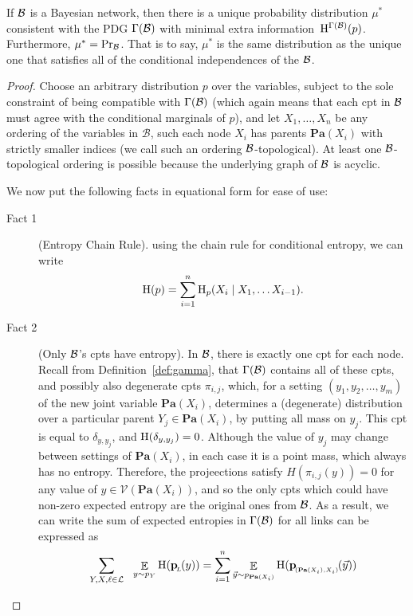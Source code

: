 \documentclass{article}
\newcommand{\bp}[1][L]{\mat{p}_{\!_{#1}\!}}
\newcommand{\V}{\mathcal V}
\def\Pa{\mathbf{Pa}}
\def\extrainfo{extra information}
\begin{document}
\begin{theorem}\label{thm:bns-are-pdgs}
	If $\cal B$ is a Bayesian network, then there is a unique probability distribution $\mu^*$ consistent with the PDG $\Gamma(\cal B)$ with minimal \extrainfo\ $\mathrm{H}^{\Gamma(\mathcal B)}(p)$. Furthermore, $\mu^* = \Pr_{\cal B}$. That is to say, $\mu^*$ is the same distribution as the unique one that satisfies all of the conditional independences of the $\cal B$.	
\end{theorem}
\begin{proof}%
	Choose an arbitrary distribution $p$ over the variables, subject to the sole constraint of being compatible with $\Gamma(\cal B)$ (which again means that each cpt in $\cal B$ must agree with the conditional marginals of $p$), and let $X_1, \ldots, X_n$ be any ordering of the variables in $\mathcal B$, such each node $X_i$ has parents $\Pa(X_i)$ with strictly smaller indices (we call such an ordering $\cal B$-topological). At least one $\cal B$-topological ordering is possible because the underlying graph of $\cal B$ is acyclic. 
	
	We now put the following facts in equational form for ease of use:
	\begin{description}
	\item[Fact 1] (Entropy Chain Rule). using the chain rule for conditional entropy, we can write 
	\[ \mathrm{H}(p) = \sum_{i = 1}^n \mathrm{H}_p(X_i \mid X_1, \ldots X_{i-1}). \]
	\item[Fact 2] (Only $\cal B$'s cpts have entropy).
	In $\cal B$, there is exactly one cpt for each node. Recall from Definition~\ref{def:gamma}, that $\Gamma(\cal B)$ contains all of these cpts, and possibly also degenerate cpts $\pi_{i,j}$, which, for a setting $(y_1, y_2, \ldots, y_m)$ of the new joint variable $\Pa(X_i)$, determines a (degenerate) distribution over a particular parent $Y_j \in \Pa(X_i)$, by putting all mass on $y_j$. This cpt is equal to $\delta_{y, y_j}$, and $\mathrm{H}(\delta_{y, y_j}) = 0$. Although the value of $y_j$ may change between settings of $\Pa(X_i)$, in each case it is a point mass, which always has no entropy. 
	Therefore, the projeections satisfy $H(\pi_{i,j}(y)) = 0$ for any value of $y \in \V(\Pa(X_i))$, and so the only cpts which could have non-zero expected entropy are the original ones from $\cal B$. As a result, we can write the sum of expected entropies in $\Gamma(\cal B)$ for all links can be expressed as
	\[\sum_{Y,X, \ell \in \cal L} ~~\E_{y \sim p_Y}  \H (\bp ( y)) = \sum_{i=1}^n\E_{\vec y \sim p_{\Pa(X_i)}}  \H (\bp[(\Pa(X_i),X_i)] (\vec y))\]
	

\end{description}
\end{proof}
\end{document}
